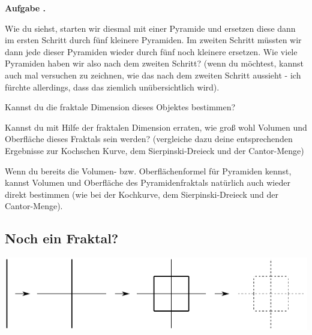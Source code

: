 \documentclass[a4paper,ngerman,12pt]{scrartcl}
\theoremstyle{definition}
\theoremstyle{plain}
\theoremstyle{remark}
\newlength{\aufgabenskip}
\newcounter{aufgabennummer}
\newenvironment{aufgabe}[1]{
  \addtocounter{aufgabennummer}{1}
  \textbf{Aufgabe \theaufgabennummer.} \emph{#1} \par
}{\vspace{\aufgabenskip}}
\begin{document}
\begin{aufgabe}{}
	Wie du siehst, starten wir diesmal mit einer Pyramide und ersetzen diese dann im ersten Schritt durch fünf kleinere Pyramiden. Im zweiten Schritt müssten wir dann jede dieser Pyramiden wieder durch fünf noch kleinere ersetzen. Wie viele Pyramiden haben wir also nach dem zweiten Schritt? (wenn du möchtest, kannst auch mal versuchen zu zeichnen, wie das nach dem zweiten Schritt aussieht - ich fürchte allerdings, dass das ziemlich unübersichtlich wird).
	
	Kannst du die fraktale Dimension dieses Objektes bestimmen? 
	
	Kannst du mit Hilfe der fraktalen Dimension erraten,  wie groß wohl Volumen und Oberfläche dieses Fraktals sein werden? (vergleiche dazu deine entsprechenden Ergebnisse zur Kochschen Kurve, dem Sierpinski-Dreieck und der Cantor-Menge) 
	
	Wenn du bereits die Volumen- bzw. Oberflächenformel für Pyramiden kennst, kannst Volumen und Oberfläche des Pyramidenfraktals natürlich auch wieder direkt bestimmen (wie bei der Kochkurve, dem Sierpinski-Dreieck und der Cantor-Menge).
\end{aufgabe}
 
%


\subsection{Noch ein Fraktal?}

\begin{center}
	\includegraphics{Bilder/Nicht-Fraktal.pdf}
\end{center}
\end{document}
